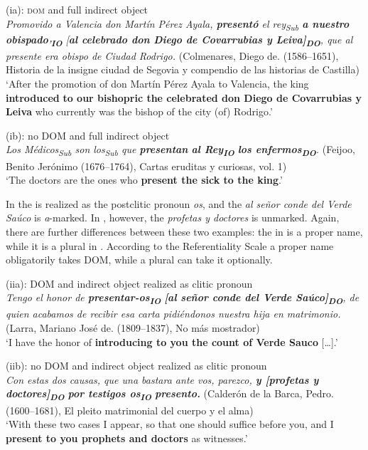 \documentclass[output=paper]{LSP/langsci}
\begin{document}
\ea (ia): \textsc{dom} and full indirect object\\\label{11-he-ex:44}
\emph{Promovido a Valencia don Martín Pérez Ayala, \textbf{presentó} el rey\textsubscript{Sub} \textbf{a nuestro obispado}\textbf{\textsubscript{’IO}} [\textbf{al celebrado don Diego de Covarrubias y Leiva]}\textbf{\textsubscript{DO}}, que al presente era obispo de Ciudad Rodrigo.} (Colmenares, Diego de. (1586–1651), Historia de la insigne ciudad de Segovia y compendio de las historias de Castilla)\\

\glt ‘After the promotion of don Martín Pérez Ayala to Valencia, the king \textbf{introduced} \textbf{to our bishopric the celebrated don Diego de Covarrubias y Leiva} who currently was the bishop of the city (of) Rodrigo.’
\z

\ea(ib): no DOM and full indirect object\\\label{11-he-ex:45}
\emph{Los Médicos\textsubscript{Sub} son los\textsubscript{Sub} que \textbf{presentan} \textbf{al Rey}\textbf{\textsubscript{IO}}\textbf{ los enfermos}\textbf{\textsubscript{DO}}.} (Feijoo, Benito Jerónimo (1676–1764), Cartas eruditas y curiosas, vol. 1)\\
\glt ‘The doctors are the ones who \textbf{present the sick to the king}.’
\z

In  the  is realized as the postclitic pronoun \textit{os}, and the  \textit{al señor conde del Verde Saúco} is \textit{a}-marked. In , however, the  \textit{profetas y doctores} is unmarked. Again, there are further differences between these two examples: the  in  is a proper name, while it is a plural  in . According to the Referentiality Scale a proper name obligatorily takes DOM, while a plural  can take it optionally.

\ea (iia): DOM and indirect object realized as clitic pronoun\\\label{11-he-ex:46}
\emph{Tengo el honor de \textbf{presentar-os}\textbf{\textsubscript{IO}} \textbf{[al señor conde del Verde Saúco]}\textbf{\textsubscript{DO}}, de quien acabamos de recibir esa carta pidiéndonos nuestra hija en matrimonio.} (Larra, Mariano José de. (1809–1837), No más mostrador)\\
\glt ‘I have the honor of \textbf{introducing to you the count of Verde Sauco} […].’
\z

\ea (iib): no DOM and indirect object realized as clitic pronoun\\\label{11-he-ex:47}
\emph{Con estas dos causas, que una bastara ante vos, parezco, \textbf{y [profetas y doctores]}\textbf{\textsubscript{DO}}\textbf{ por testigos os}\textbf{\textsubscript{IO}}\textbf{ presento.}} (Calderón de la Barca, Pedro. (1600–1681), El pleito matrimonial del cuerpo y el alma)\\
\glt ‘With these two cases I appear, so that one should suffice before you, and I \textbf{present to you prophets and doctors} as witnesses.’
\z
\end{document}
